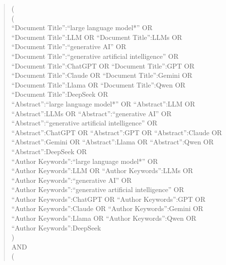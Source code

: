 \begin{quote}
\begin{minipage}{0.96\textwidth}
\scriptsize\ttfamily\raggedright
(\\
\quad (\\
\qquad ``Document Title'':``large language model*'' OR\\
\qquad ``Document Title'':LLM OR ``Document Title'':LLMs OR\\
\qquad ``Document Title'':``generative AI'' OR\\
\qquad ``Document Title'':``generative artificial intelligence'' OR\\
\qquad ``Document Title'':ChatGPT OR ``Document Title'':GPT OR\\
\qquad ``Document Title'':Claude OR ``Document Title'':Gemini OR\\
\qquad ``Document Title'':Llama OR ``Document Title'':Qwen OR\\
\qquad ``Document Title'':DeepSeek OR\\
\qquad ``Abstract'':``large language model*'' OR ``Abstract'':LLM OR\\
\qquad ``Abstract'':LLMs OR ``Abstract'':``generative AI'' OR\\
\qquad ``Abstract'':``generative artificial intelligence'' OR\\
\qquad ``Abstract'':ChatGPT OR ``Abstract'':GPT OR ``Abstract'':Claude OR\\
\qquad ``Abstract'':Gemini OR ``Abstract'':Llama OR ``Abstract'':Qwen OR\\
\qquad ``Abstract'':DeepSeek OR\\
\qquad ``Author Keywords'':``large language model*'' OR\\
\qquad ``Author Keywords'':LLM OR ``Author Keywords'':LLMs OR\\
\qquad ``Author Keywords'':``generative AI'' OR\\
\qquad ``Author Keywords'':``generative artificial intelligence'' OR\\
\qquad ``Author Keywords'':ChatGPT OR ``Author Keywords'':GPT OR\\
\qquad ``Author Keywords'':Claude OR ``Author Keywords'':Gemini OR\\
\qquad ``Author Keywords'':Llama OR ``Author Keywords'':Qwen OR\\
\qquad ``Author Keywords'':DeepSeek\\
\quad )\\
\quad AND\\
\quad (\\

\end{minipage}
\end{quote}
